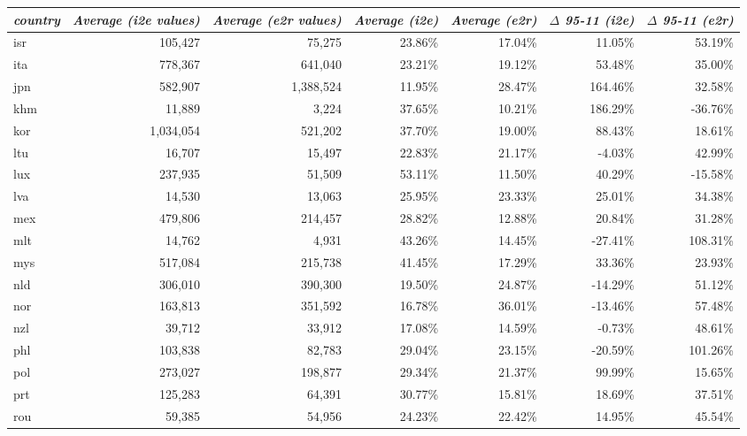 \documentclass[11pt,a4paper]{article}
\begin{document}
\begin{table}[h]\small
  \centering
    \hspace*{-2.8cm}
    \begin{tabular}{lrrrrrr}
    \toprule
    \multicolumn{1}{l}{\textit{country}} & \multicolumn{1}{c}{\textit{Average (i2e values)}} & \multicolumn{1}{c}{\textit{Average (e2r values)}} & \multicolumn{1}{c}{\textit{Average (i2e)}} & \multicolumn{1}{c}{\textit{Average (e2r)}} & \multicolumn{1}{c}{\textit{$\Delta$ 95-11 (i2e)}} & \multicolumn{1}{c}{\textit{$\Delta$ 95-11  (e2r)}} \\
    \midrule
    isr   & 105,427 & 75,275 & 23.86\% & 17.04\% & 11.05\% & 53.19\% \\
    ita   & 778,367 & 641,040 & 23.21\% & 19.12\% & 53.48\% & 35.00\% \\
    jpn   & 582,907 & 1,388,524 & 11.95\% & 28.47\% & 164.46\% & 32.58\% \\
    khm   & 11,889 & 3,224 & 37.65\% & 10.21\% & 186.29\% & -36.76\% \\
    kor   & 1,034,054 & 521,202 & 37.70\% & 19.00\% & 88.43\% & 18.61\% \\
    ltu   & 16,707 & 15,497 & 22.83\% & 21.17\% & -4.03\% & 42.99\% \\
    lux   & 237,935 & 51,509 & 53.11\% & 11.50\% & 40.29\% & -15.58\% \\
    lva   & 14,530 & 13,063 & 25.95\% & 23.33\% & 25.01\% & 34.38\% \\
    mex   & 479,806 & 214,457 & 28.82\% & 12.88\% & 20.84\% & 31.28\% \\
    mlt   & 14,762 & 4,931 & 43.26\% & 14.45\% & -27.41\% & 108.31\% \\
    mys   & 517,084 & 215,738 & 41.45\% & 17.29\% & 33.36\% & 23.93\% \\
    nld   & 306,010 & 390,300 & 19.50\% & 24.87\% & -14.29\% & 51.12\% \\
    nor   & 163,813 & 351,592 & 16.78\% & 36.01\% & -13.46\% & 57.48\% \\
    nzl   & 39,712 & 33,912 & 17.08\% & 14.59\% & -0.73\% & 48.61\% \\
    phl   & 103,838 & 82,783 & 29.04\% & 23.15\% & -20.59\% & 101.26\% \\
    pol   & 273,027 & 198,877 & 29.34\% & 21.37\% & 99.99\% & 15.65\% \\
    prt   & 125,283 & 64,391 & 30.77\% & 15.81\% & 18.69\% & 37.51\% \\
    rou   & 59,385 & 54,956 & 24.23\% & 22.42\% & 14.95\% & 45.54\% \\

\end{tabular}
\end{table}
\end{document}
